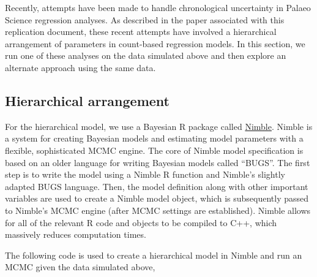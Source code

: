 \documentclass[]{article}
\begin{document}
Recently, attempts have been made to handle chronological uncertainty in
Palaeo Science regression analyses. As described in the paper associated
with this replication document, these recent attempts have involved a
hierarchical arrangement of parameters in count-based regression models.
In this section, we run one of these analyses on the data simulated
above and then explore an alternate approach using the same data.

\subsection{Hierarchical arrangement}\label{hierarchical-arrangement}

For the hierarchical model, we use a Bayesian R package called
\href{https://r-nimble.org/}{Nimble}. Nimble is a system for creating
Bayesian models and estimating model parameters with a flexible,
sophisticated MCMC engine. The core of Nimble model specification is
based on an older language for writing Bayesian models called ``BUGS''.
The first step is to write the model using a Nimble R function and
Nimble's slightly adapted BUGS language. Then, the model definition
along with other important variables are used to create a Nimble model
object, which is subsequently passed to Nimble's MCMC engine (after MCMC
settings are established). Nimble allows for all of the relevant R code
and objects to be compiled to C++, which massively reduces computation
times.

The following code is used to create a hierarchical model in Nimble and
run an MCMC given the data simulated above,
\end{document}
